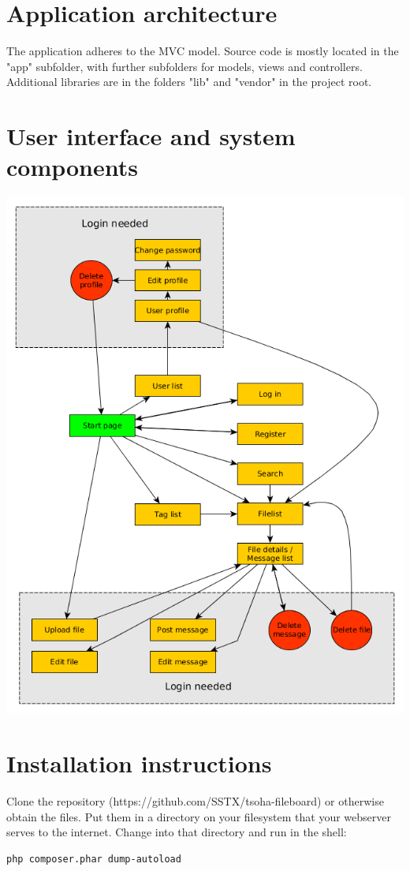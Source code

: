 \documentclass[10pt,a4paper]{article}
\begin{document}
\section{Application architecture}
The application adheres to the MVC model. Source code is mostly located in the "app" subfolder, with further subfolders for models, views and controllers. Additional libraries are in the folders "lib" and "vendor" in the project root. 

\section{User interface and system components}
\includegraphics[scale=0.65]{diagrams/pageflow.png}

\section{Installation instructions}
Clone the repository (https://github.com/SSTX/tsoha-fileboard) or otherwise obtain the files. Put them in a directory on your filesystem that your webserver serves to the internet. Change into that directory and run in the shell:
\begin{lstlisting}
php composer.phar dump-autoload
\end{lstlisting}
\end{document}
